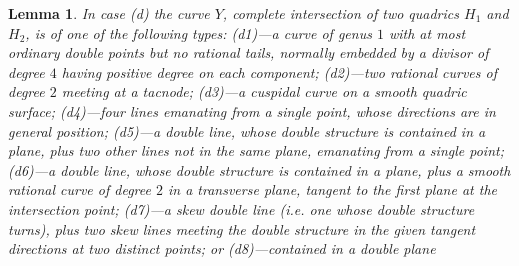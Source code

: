 \documentclass{amsart}
\theoremstyle{plain}
\newtheorem{lemma}[theorem]{Lemma}
\numberwithin{equation}{section}
\begin{document}
\begin{lemma}
\label{dcases}
In case (d) the curve $Y$, complete intersection
of two quadrics $H_1$ and $H_2$, is of one of the following types:
\newline
(d1)---a curve of genus $1$ with at most ordinary double points but no rational tails,
normally embedded by a divisor of degree $4$ having positive degree on each component;
\newline
(d2)---two rational curves of degree $2$ meeting at a tacnode;
\newline
(d3)---a cuspidal curve on a smooth quadric surface;
\newline
(d4)---four lines emanating from a single point, whose directions are in general position; 
\newline
(d5)---a double line, whose double structure is contained in a plane, plus two 
other lines not in the same plane, emanating from a single point;
\newline
(d6)---a double line, whose double structure is contained in a plane, plus a smooth rational
curve of degree $2$ in a transverse plane, tangent to the first plane at the intersection point;
\newline
(d7)---a skew double line (i.e. one 
whose double structure turns), plus two skew lines meeting the 
double structure in the given tangent directions at two distinct points; or
\newline
(d8)---contained in a double plane
\end{lemma}
\end{document}
